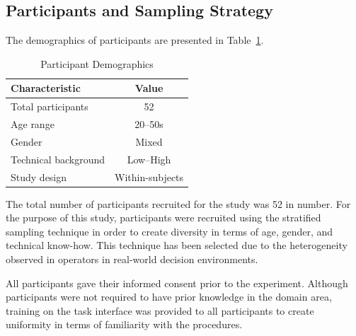 \documentclass[journal]{IEEEtran}
\theoremstyle{plain}
\theoremstyle{definition}
\begin{document}
    \subsection{Participants and Sampling Strategy}

    The demographics of participants are presented in Table~\ref{tab:participants}.

    \begin{table}[t]

        \caption{Participant Demographics}

        \label{tab:participants}

        \centering

        \begin{tabular}{l c}

            \hline

            Characteristic & Value \\

            \hline

            Total participants & 52 \\

            Age range & 20--50s \\

            Gender & Mixed \\

            Technical background & Low--High \\

            Study design & Within-subjects \\

            \hline

        \end{tabular}

    \end{table}

    The total number of participants recruited for the study was 52 in number. For the purpose of this study, participants were recruited using the stratified sampling technique in order to create diversity in terms of age, gender, and technical know-how. This technique has been selected due to the heterogeneity observed in operators in real-world decision environments.

    All participants gave their informed consent prior to the experiment. Although participants were not required to have prior knowledge in the domain area, training on the task interface was provided to all participants to create uniformity in terms of familiarity with the procedures.
\end{document}
